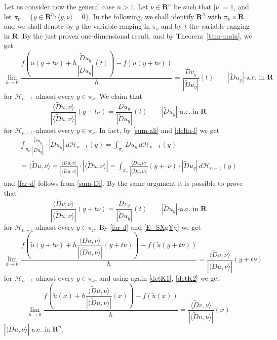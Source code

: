 \documentclass{article}
\theoremstyle{definition}
\theoremstyle{remark}
\newcommand{\thmref}[1]{Theorem~\ref{#1}}
\newcommand{\wt}{\widetilde}
\newcommand{\envert}[1]{\left\lvert#1\right\rvert}
\let\abs=\envert
\begin{document}
Let us consider now the general case $n>1$. Let $\nu\in \mathbf{R}^n$ be
such that $\abs{\nu}=1$, and let $\pi_\nu=\{y\in\mathbf{R}^n: \langle
y,\nu\rangle =0\}$. In the following, we shall identify $\mathbf{R}^n$
with $\pi_\nu\times\mathbf{R}$, and we shall denote by $y$ the variable
ranging in $\pi_\nu$ and by $t$ the variable ranging in $\mathbf{R}$. By
the just proven one-dimensional result, and by \thmref{thm-main}, we get
\[\lim_{h\to 0}\frac{f(\tilde u(y+t\nu)+h\dfrac{\wt{D}u_y}{\abs{
\wt{D}u_y}}(t))-f(\tilde u(y+t\nu))}h=\frac{\wt{D}v_y}{\abs{
\wt{D}u_y}}(t)\qquad\abs{\wt{D}u_y}\text{-a.e. in }\mathbf{R}\]
for $\mathcal{H}_{n-1}$-almost every $y\in \pi_\nu$. We claim that
\begin{equation}
\frac{\langle \wt{D}u,\nu\rangle }{\abs{\langle \wt{D}u,\nu\rangle
}}(y+t\nu)=\frac{\wt{D}u_y}
{\abs{\wt{D}u_y}}(t)\qquad\abs{\wt{D}u_y}\text{-a.e. in }\mathbf{R}
\end{equation}
for $\mathcal{H}_{n-1}$-almost every $y\in\pi_\nu$. In fact, by
\eqref{sum-ali} and \eqref{delta-l} we get
\begin{multline*}
\int_{\pi_\nu}\frac{\wt{D}u_y}{\abs{\wt{D}u_y}}\cdot\abs{\wt{D}u_y
}\,d\mathcal{H}_{n-1}(y)=\int_{\pi_\nu}\wt{D}u_y\,d\mathcal{H}_{n-1}(y)\\
=\langle \wt{D}u,\nu\rangle =\frac
{\langle \wt{D}u,\nu\rangle }{\abs{\langle \wt{D}u,\nu\rangle}}\cdot
\abs{\langle \wt{D}u,\nu\rangle }=\int_{\pi_\nu}\frac{
\langle \wt{D}u,\nu\rangle }{\abs{\langle \wt{D}u,\nu\rangle }}
(y+\cdot \nu)\cdot\abs{\wt{D}u_y}\,d\mathcal{H}_{n-1}(y)
\end{multline*}
and \eqref{far-d} follows from \eqref{sum-Di}. By the same argument it
is possible to prove that
\begin{equation}
\frac{\langle \wt{D}v,\nu\rangle }{\abs{\langle \wt{D}u,\nu\rangle
}}(y+t\nu)=\frac{\wt{D}v_y}{\abs{\wt{D}u_y}}(t)\qquad\abs{
\wt{D}u_y}\text{-a.e. in }\mathbf{R}\end{equation}
for $\mathcal{H}_{n-1}$-almost every $y\in \pi_\nu$. By \eqref{far-d}
and \eqref{E_SXgYy} we get
\[
\lim_{h\to 0}\frac{f(\tilde u(y+t\nu)+h\dfrac{\langle \wt{D}
u,\nu\rangle }{\abs{\langle \wt{D}u,\nu\rangle }}(y+t\nu))-f(\tilde
u(y+t\nu))}{h}
=\frac{\langle \wt{D}v,\nu\rangle }{\abs{\langle
\wt{D}u,\nu\rangle }}(y+t\nu)\]
for $\mathcal{H}_{n-1}$-almost every $y\in\pi_\nu$, and using again
\eqref{detK1}, \eqref{detK2} we get
\[
\lim_{h\to 0}\frac{f(\tilde u(x)+h\dfrac{\langle
\wt{D}u,\nu\rangle }{\abs{\langle \wt{D}u,\nu\rangle }}(x))-f(\tilde
u(x))}{h}=\frac{\langle \wt{D}v,\nu\rangle }{\abs{\langle \wt{D}u,\nu
\rangle }}(x)
\]
$\abs{\langle \wt{D}u,\nu\rangle}$-a.e. in $\mathbf{R}^n$.
\end{document}
